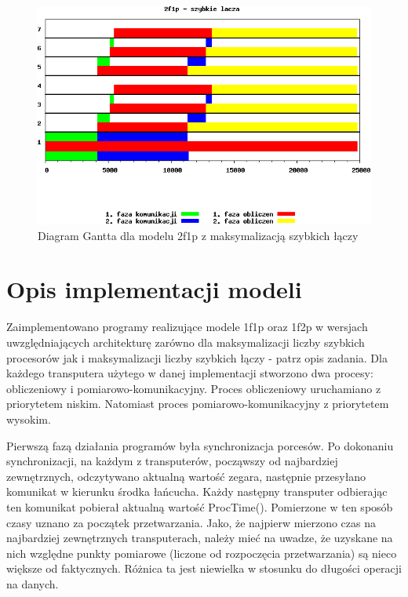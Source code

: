 \documentclass[a4paper,11pt, titlepage]{article}
\begin{document}
\begin{figure}[p!]
\includegraphics[width=1.0\textwidth]{wykresy/1p2f_lacza}
\caption{Diagram Gantta dla modelu 2f1p z maksymalizacją szybkich łączy \label{1p2f_l}}
\end{figure}
\clearpage
\section{Opis implementacji modeli}
Zaimplementowano programy realizujące modele 1f1p oraz 1f2p w wersjach uwzględniających architekturę zarówno dla maksymalizacji liczby szybkich procesorów jak i maksymalizacji liczby szybkich łączy - patrz opis zadania. Dla każdego transputera użytego w danej implementacji stworzono dwa procesy: obliczeniowy i pomiarowo-komunikacyjny. Proces obliczeniowy uruchamiano z priorytetem niskim. Natomiast proces pomiarowo-komunikacyjny z priorytetem wysokim.

Pierwszą fazą działania programów była synchronizacja porcesów. Po dokonaniu synchronizacji, na każdym z transputerów, począwszy od najbardziej zewnętrznych, odczytywano aktualną wartość zegara, następnie przesyłano komunikat w kierunku środka łańcucha. Każdy następny transputer odbierając ten komunikat pobierał aktualną wartość ProcTime(). Pomierzone w ten sposób czasy uznano za początek przetwarzania. Jako, że najpierw mierzono czas na najbardziej zewnętrznych transputerach, należy mieć na uwadze, że uzyskane na nich względne punkty pomiarowe (liczone od rozpoczęcia przetwarzania) są nieco większe od faktycznych. Różnica ta jest niewielka w stosunku do długości operacji na danych.
\end{document}
